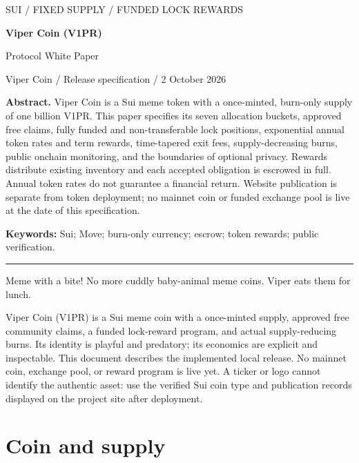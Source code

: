 \documentclass[11pt]{article}
\begin{document}
\begin{center}
{\small\sffamily\color{viper} SUI / FIXED SUPPLY / FUNDED LOCK REWARDS}\par\vspace{8pt}
{\LARGE\bfseries Viper Coin (V1PR)}\par\vspace{4pt}
{\large Protocol White Paper}\par\vspace{6pt}
{\small Viper Coin / Release specification / 2 October 2026}\par\vspace{10pt}
\end{center}
\noindent\textbf{Abstract.} Viper Coin is a Sui meme token with a once-minted, burn-only supply of one billion V1PR. This paper specifies its seven allocation buckets, approved free claims, fully funded and non-transferable lock positions, exponential annual token rates and term rewards, time-tapered exit fees, supply-decreasing burns, public onchain monitoring, and the boundaries of optional privacy. Rewards distribute existing inventory and each accepted obligation is escrowed in full. Annual token rates do not guarantee a financial return. Website publication is separate from token deployment; no mainnet coin or funded exchange pool is live at the date of this specification.\par\vspace{6pt}
\noindent\textbf{Keywords:} Sui; Move; burn-only currency; escrow; token rewards; public verification.\par\vspace{10pt}
\hrule\vspace{14pt}
Meme with a bite! No more cuddly baby-animal meme coins. Viper eats them for lunch.

Viper Coin (V1PR) is a Sui meme coin with a once-minted supply, approved free community claims, a funded lock-reward program, and actual supply-reducing burns. Its identity is playful and predatory; its economics are explicit and inspectable. This document describes the implemented local release. No mainnet coin, exchange pool, or reward program is live yet. A ticker or logo cannot identify the authentic asset: use the verified Sui coin type and publication records displayed on the project site after deployment.

\section{Coin and supply}
\end{document}
